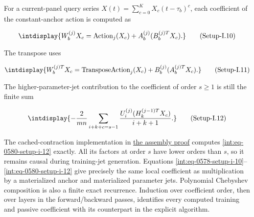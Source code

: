 
For a current-panel query series \(X(t)=\sum_{c=0}^KX_c(t-\tau_b)^c\), each coefficient of the constant-anchor action is computed as


\label{int:eq-setup-i-10}
\begingroup\renewcommand{\theHequation}{intdisplay.1092}
\begin{equation}
\intdisplay{
W_b^{(j)}X_c
=\operatorname{Action}_j(X_c)+A_b^{(j)}(B_b^{(j)T}X_c).
}
\tag{Setup-I.10}
\label{int:eq-0578-setup-i-10}
\end{equation}
\endgroup


The transpose uses


\label{int:eq-setup-i-11}
\begingroup\renewcommand{\theHequation}{intdisplay.1093}
\begin{equation}
\intdisplay{
W_b^{(j)T}X_c
=\operatorname{TransposeAction}_j(X_c)
 +B_b^{(j)}(A_b^{(j)T}X_c).
}
\tag{Setup-I.11}
\label{int:eq-0579-setup-i-11}
\end{equation}
\endgroup


The higher-parameter-jet contribution to the coefficient of order \(s\ge1\) is still the finite sum


\label{int:eq-setup-i-12}
\begingroup\renewcommand{\theHequation}{intdisplay.1094}
\begin{equation}
\intdisplay{
-\frac2{mn}\sum_{i+k+c=s-1}
\frac{U_i^{(j)}(H_k^{(j-1)T}X_c)}{i+k+1}.
}
\tag{Setup-I.12}
\label{int:eq-0580-setup-i-12}
\end{equation}
\endgroup


The cached-contraction implementation in \hyperref[int:setup-assembly]{the assembly proof} computes \hyperref[int:eq-setup-i-12]{\eqref{int:eq-0580-setup-i-12}} exactly. All its factors at order \(s\) have lower orders than \(s\), so it remains causal during training-jet generation. Equations \hyperref[int:eq-setup-i-10]{\eqref{int:eq-0578-setup-i-10}}--\allowbreak \hyperref[int:eq-setup-i-12]{\eqref{int:eq-0580-setup-i-12}} give precisely the same local coefficient as multiplication by a materialized anchor and materialized parameter jets. Polynomial Chebyshev composition is also a finite exact recurrence. Induction over coefficient order, then over layers in the forward/backward passes, identifies every computed training and passive coefficient with its counterpart in the explicit algorithm.


